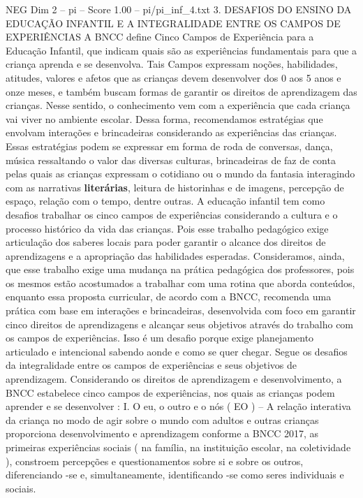 \begin{textsample}{NEG Dim 2 – pi – Score 1.00 – pi/pi\_inf\_4.txt}  \label{ex:f2_neg_194}
3.
DESAFIOS DO ENSINO DA EDUCAÇÃO INFANTIL E A INTEGRALIDADE ENTRE OS CAMPOS DE EXPERIÊNCIAS A BNCC define Cinco Campos de Experiência para a Educação Infantil, que indicam quais são as experiências fundamentais para que a criança aprenda e se desenvolva.
Tais Campos expressam noções, habilidades, atitudes, valores e afetos que as crianças devem desenvolver dos 0 aos 5 anos e onze meses, e também buscam formas de garantir os direitos de aprendizagem das crianças.
Nesse sentido, o conhecimento vem com a experiência que cada criança vai viver no ambiente escolar.
Dessa forma, recomendamos estratégias que envolvam interações e brincadeiras considerando as experiências das crianças.
Essas estratégias podem se expressar em forma de roda de conversas, dança, música ressaltando o valor das diversas culturas, brincadeiras de faz de conta pelas quais as crianças expressam o cotidiano ou o mundo da fantasia interagindo com as narrativas \textbf{literárias}, leitura de historinhas e de imagens, percepção de espaço, relação com o tempo, dentre outras.
A educação infantil tem como desafios trabalhar os cinco campos de experiências considerando a cultura e o processo histórico da vida das crianças.
Pois esse trabalho pedagógico exige articulação dos saberes locais para poder garantir o alcance dos direitos de aprendizagens e a apropriação das habilidades esperadas.
Consideramos, ainda, que esse trabalho exige uma mudança na prática pedagógica dos professores, pois os mesmos estão acostumados a trabalhar com uma rotina que aborda conteúdos, enquanto essa proposta curricular, de acordo com a BNCC, recomenda uma prática com base em interações e brincadeiras, desenvolvida com foco em garantir cinco direitos de aprendizagens e alcançar seus objetivos através do trabalho com os campos de experiências.
Isso é um desafio porque exige planejamento articulado e intencional sabendo aonde e como se quer chegar.
Segue os desafios da integralidade entre os campos de experiências e seus objetivos de aprendizagem.
Considerando os direitos de aprendizagem e desenvolvimento, a BNCC estabelece cinco campos de experiências, nos quais as crianças podem aprender e se desenvolver : I.
O eu, o outro e o nós ( EO ) – A relação interativa da criança no modo de agir sobre o mundo com adultos e outras crianças proporciona desenvolvimento e aprendizagem conforme a BNCC 2017, as primeiras experiências sociais ( na família, na instituição escolar, na coletividade ), constroem percepções e questionamentos sobre si e sobre os outros, diferenciando -se e, simultaneamente, identificando -se como seres individuais e sociais.

\end{textsample}

